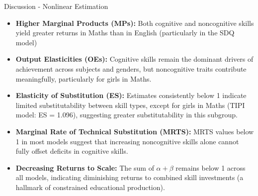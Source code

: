 \documentclass{beamer}
\begin{document}
\begin{frame}{Discussion - Nonlinear Estimation}
\small
\begin{itemize}
    \item \textbf{Higher Marginal Products (MPs):} Both cognitive and noncognitive skills yield greater returns in Maths than in English (particularly in the SDQ model)
    
    \item \textbf{Output Elasticities (OEs):} Cognitive skills remain the dominant drivers of achievement across subjects and genders, but noncognitive traits contribute meaningfully, particularly for girls in Maths.
    
    \item \textbf{Elasticity of Substitution (ES):} Estimates consistently below 1 indicate limited substitutability between skill types, except for girls in Maths (TIPI model: ES = 1.096), suggesting greater substitutability in this subgroup.
    
    \item \textbf{Marginal Rate of Technical Substitution (MRTS):} MRTS values below 1 in most models suggest that increasing noncognitive skills alone cannot fully offset deficits in cognitive skills.
    
    \item \textbf{Decreasing Returns to Scale:} The sum of $\alpha + \beta$ remains below 1 across all models, indicating diminishing returns to combined skill investments (a hallmark of constrained educational production).
\end{itemize}
\end{frame}
\end{document}
